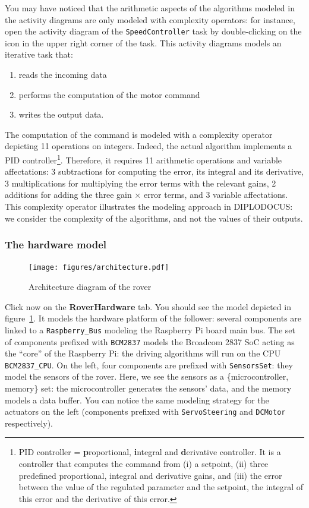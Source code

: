 \documentclass{article}
\begin{document}
You may have noticed that the arithmetic aspects of the algorithms modeled in the activity diagrams are only modeled with complexity operators: for instance, open the activity diagram of the \texttt{SpeedController} task by double-clicking on the icon in the upper right corner of the task. This activity diagrams models an iterative task that:
\begin{enumerate}
	\item reads the incoming data
	\item performs the computation of the motor command
	\item writes the output data.
\end{enumerate}
The computation of the command is modeled with a complexity operator depicting 11 operations on integers. Indeed, the actual algorithm implements a PID controller\footnote{PID controller = \textbf{p}roportional, \textbf{i}ntegral and \textbf{d}erivative controller. It is a controller that computes the command from (i) a setpoint, (ii) three predefined proportional, integral and derivative gains, and (iii) the error between the value of the regulated parameter and the setpoint, the integral of this error and the derivative of this error.}. Therefore, it requires 11 arithmetic operations and variable affectations: 3 subtractions for computing the error, its integral and its derivative, 3 multiplications for multiplying the error terms with the relevant gains, 2 additions for adding the three gain $\times$ error terms, and 3 variable affectations. This complexity operator illustrates the modeling approach in DIPLODOCUS: we consider the complexity of the algorithms, and not the values of their outputs.

\subsubsection{The hardware model}

\begin{figure}
	\hspace*{-1cm}
	\centering
	\texttt{[image: figures/architecture.pdf]}
	\caption{Architecture diagram of the rover}
	\label{fig:roverarchitecture}
\end{figure}

Click now on the \textbf{RoverHardware} tab. You should see the model depicted in figure~\ref{fig:roverarchitecture}. It models the hardware platform of the follower: several components are linked to a \texttt{Raspberry\_Bus} modeling the Raspberry Pi board main bus. The set of components prefixed with \texttt{BCM2837} models the Broadcom 2837 SoC acting as the ``core'' of the Raspberry Pi: the driving algorithms will run on the CPU \texttt{BCM2837\_CPU}. On the left, four components are prefixed with \texttt{SensorsSet}: they model the sensors of the rover. Here, we see the sensors as a \{microcontroller, memory\} set: the microcontroller generates the sensors' data, and the memory models a data buffer. You can notice the same modeling strategy for the actuators on the left (components prefixed with \texttt{ServoSteering} and \texttt{DCMotor} respectively).
\end{document}
